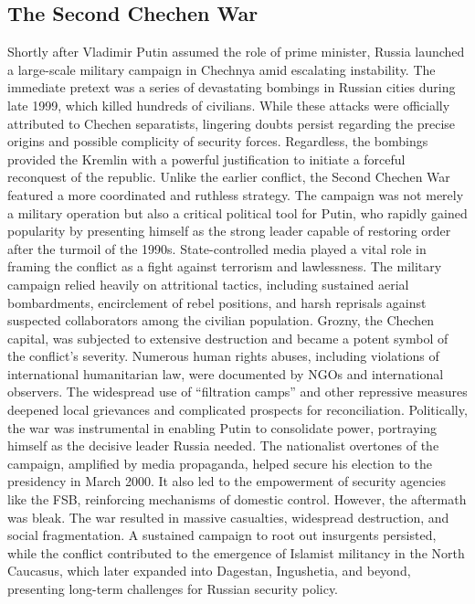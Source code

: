 \documentclass[12pt]{article}
\begin{document}
\subsection*{The Second Chechen War}
Shortly after Vladimir Putin assumed the role of prime minister, Russia launched a large-scale military campaign in Chechnya amid escalating instability. The immediate pretext was a series of devastating bombings in Russian cities during late 1999, which killed hundreds of civilians. While these attacks were officially attributed to Chechen separatists, lingering doubts persist regarding the precise origins and possible complicity of security forces. Regardless, the bombings provided the Kremlin with a powerful justification to initiate a forceful reconquest of the republic.
Unlike the earlier conflict, the Second Chechen War featured a more coordinated and ruthless strategy. The campaign was not merely a military operation but also a critical political tool for Putin, who rapidly gained popularity by presenting himself as the strong leader capable of restoring order after the turmoil of the 1990s. State-controlled media played a vital role in framing the conflict as a fight against terrorism and lawlessness.
The military campaign relied heavily on attritional tactics, including sustained aerial bombardments, encirclement of rebel positions, and harsh reprisals against suspected collaborators among the civilian population. Grozny, the Chechen capital, was subjected to extensive destruction and became a potent symbol of the conflict’s severity. Numerous human rights abuses, including violations of international humanitarian law, were documented by NGOs and international observers. The widespread use of “filtration camps” and other repressive measures deepened local grievances and complicated prospects for reconciliation.
Politically, the war was instrumental in enabling Putin to consolidate power, portraying himself as the decisive leader Russia needed. The nationalist overtones of the campaign, amplified by media propaganda, helped secure his election to the presidency in March 2000. It also led to the empowerment of security agencies like the FSB, reinforcing mechanisms of domestic control.
However, the aftermath was bleak. The war resulted in massive casualties, widespread destruction, and social fragmentation. A sustained campaign to root out insurgents persisted, while the conflict contributed to the emergence of Islamist militancy in the North Caucasus, which later expanded into Dagestan, Ingushetia, and beyond, presenting long-term challenges for Russian security policy.
\end{document}
